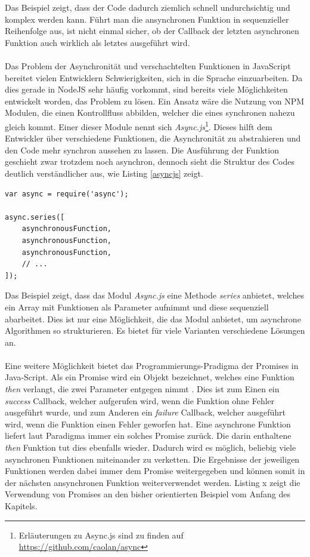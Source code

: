 Das Beispiel zeigt, dass der Code dadurch ziemlich schnell undurchsichtig und komplex werden kann. Führt man die ansynchronen Funktion in sequenzieller Reihenfolge aus, ist nicht einmal sicher, ob der Callback der letzten asynchronen Funktion auch wirklich als letztes ausgeführt wird.\\
\\
Das Problem der Asynchronität und verschachtelten Funktionen in JavaScript bereitet vielen Entwicklern Schwierigkeiten, sich in die Sprache einzuarbeiten. Da dies gerade in NodeJS sehr häufig vorkommt, sind bereits viele Möglichkeiten entwickelt worden, das Problem zu lösen. Ein Ansatz wäre die Nutzung von NPM Modulen, die einen Kontrollfluss abbilden, welcher die eines synchronen nahezu gleich kommt. Einer dieser Module nennt sich \textit{Async.js}\footnote{Erläuterungen zu Async.js sind zu finden auf \url{https://github.com/caolan/async}}. Dieses hilft dem Entwickler über verschiedene Funktionen, die Asynchronität zu abstrahieren und den Code mehr synchron aussehen zu lassen. Die Ausführung der Funktion geschieht zwar trotzdem noch asynchron, dennoch sieht die Struktur des Codes deutlich verständlicher aus, wie Listing \ref{asyncjs} zeigt.

\vspace{0.6cm}
\begin{lstlisting}[caption=Sequenzielle Abarbeitung von asynchronen Code durch das Async.js Module,label=asyncjs]
var async = require('async');

async.series([
    asynchronousFunction,
    asynchronousFunction,
    asynchronousFunction,
    // ...
]);
\end{lstlisting}
\vspace{0.3cm}

Das Beispiel zeigt, dass das Modul \textit{Async.js} eine Methode \textit{series} anbietet, welches ein Array mit Funktionen als Parameter aufnimmt und diese sequenziell abarbeitet. Dies ist nur eine Möglichkeit, die das Modul anbietet, um asynchrone Algorithmen so strukturieren. Es bietet für viele Varianten verschiedene Lösungen an.\\
\\
Eine weitere Möglichkeit bietet das Programmierungs-Pradigma der \glqq Promises\grqq{} in Java-Script. Als ein Promise wird ein Objekt bezeichnet, welches eine Funktion \textit{then} verlangt, die zwei Parameter entgegen nimmt \cite{promises}. Dies ist zum Einen ein \textit{success} Callback, welcher aufgerufen wird, wenn die Funktion ohne Fehler ausgeführt wurde, und zum Anderen ein \textit{failure} Callback, welcher ausgeführt wird, wenn die Funktion einen Fehler geworfen hat. Eine asynchrone Funktion liefert laut Paradigma immer ein solches Promise zurück. Die darin enthaltene \textit{then} Funktion tut dies ebenfalls wieder. Dadurch wird es möglich, beliebig viele asynchronen Funktionen miteinander zu verketten. Die Ergebnisse der jeweiligen Funktionen werden dabei immer dem Promise weitergegeben und können somit in der nächsten ansynchronen Funktion weiterverwendet werden. Listing x zeigt die Verwendung von Promises an den bisher orientierten Beispiel vom Anfang des Kapitels. 

